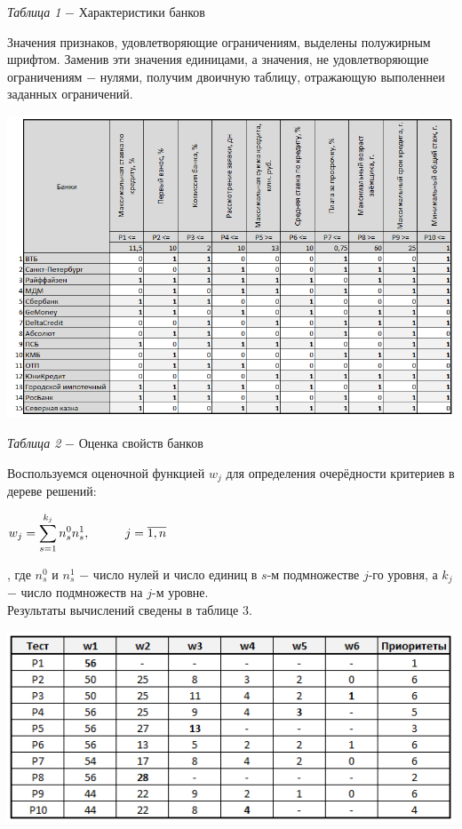 \documentclass[14pt,fleqn]{extarticle}
\begin{document}
	\begin{center}
		\textit{Таблица 1} $-$ Характеристики банков
	\end{center}
	\newpage
	Значения признаков, удовлетворяющие ограничениям, выделены полужирным шрифтом. Заменив эти значения единицами, а значения, не удовлетворяющие ограничениям $-$ нулями, получим двоичную таблицу, отражающую выполеннеи заданных ограничений.
	\begin{center}
		\includegraphics[scale=0.82]{2}
	\end{center}
	\begin{center}
		\textit{Таблица 2} $-$ Оценка свойств банков
	\end{center}
	Воспользуемся оценочной функцией $w_j$ для определения очерёдности критериев в дереве решений:
	\begin{center}
		$w_j = \smashoperator[r]{\sum_{s = 1}^{k_j}}n^0_s n^1_s, \hspace*{1cm} j=\overline{1,n}$
	\end{center}
	, где $n^0_s$ и $n^1_s$ $-$ число нулей и число единиц в $s$-м подмножестве $j$-го уровня, а $k_j$ $-$ число подмножеств на $j$-м уровне.\\
	Результаты вычислений сведены в таблице 3.
	\newpage
	\begin{center}
		\includegraphics[scale=0.9]{3}
	\end{center}
\end{document}
